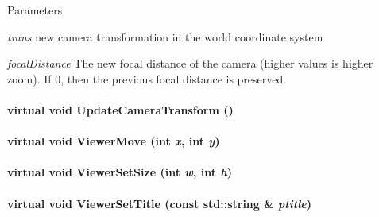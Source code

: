 \begin{DoxyParams}{Parameters}
\item[{\em trans}]new camera transformation in the world coordinate system \item[{\em focalDistance}]The new focal distance of the camera (higher values is higher zoom). If 0, then the previous focal distance is preserved. \end{DoxyParams}
\hypertarget{classOpenRAVE_1_1ViewerBase_a8ba08e058dbbaf19090cc79cd22055f6}{
\paragraph[{UpdateCameraTransform}]{\setlength{\rightskip}{0pt plus 5cm}virtual void UpdateCameraTransform ()}\hfill}
\label{classOpenRAVE_1_1ViewerBase_a8ba08e058dbbaf19090cc79cd22055f6}
\hypertarget{classOpenRAVE_1_1ViewerBase_a00e98066bc03fa4d2b287d2a6a2d2b4c}{
\paragraph[{ViewerMove}]{\setlength{\rightskip}{0pt plus 5cm}virtual void ViewerMove (int {\em x}, \/  int {\em y})}\hfill}
\label{classOpenRAVE_1_1ViewerBase_a00e98066bc03fa4d2b287d2a6a2d2b4c}
\hypertarget{classOpenRAVE_1_1ViewerBase_a93a7763493f3da4687ca55db4a32b05e}{
\paragraph[{ViewerSetSize}]{\setlength{\rightskip}{0pt plus 5cm}virtual void ViewerSetSize (int {\em w}, \/  int {\em h})}\hfill}
\label{classOpenRAVE_1_1ViewerBase_a93a7763493f3da4687ca55db4a32b05e}
\hypertarget{classOpenRAVE_1_1ViewerBase_adfc56134be2ef5b157c9a0b55d5d4e13}{
\paragraph[{ViewerSetTitle}]{\setlength{\rightskip}{0pt plus 5cm}virtual void ViewerSetTitle (const std::string \& {\em ptitle})}\hfill}
\label{classOpenRAVE_1_1ViewerBase_adfc56134be2ef5b157c9a0b55d5d4e13}
